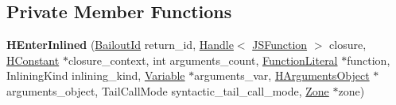 \subsection*{Private Member Functions}
\begin{DoxyCompactItemize}
\item 
{\bfseries H\+Enter\+Inlined} (\hyperlink{classv8_1_1internal_1_1_bailout_id}{Bailout\+Id} return\+\_\+id, \hyperlink{classv8_1_1internal_1_1_handle}{Handle}$<$ \hyperlink{classv8_1_1internal_1_1_j_s_function}{J\+S\+Function} $>$ closure, \hyperlink{classv8_1_1internal_1_1_h_constant}{H\+Constant} $\ast$closure\+\_\+context, int arguments\+\_\+count, \hyperlink{classv8_1_1internal_1_1_function_literal}{Function\+Literal} $\ast$function, Inlining\+Kind inlining\+\_\+kind, \hyperlink{classv8_1_1internal_1_1_variable}{Variable} $\ast$arguments\+\_\+var, \hyperlink{classv8_1_1internal_1_1_h_arguments_object}{H\+Arguments\+Object} $\ast$arguments\+\_\+object, Tail\+Call\+Mode syntactic\+\_\+tail\+\_\+call\+\_\+mode, \hyperlink{classv8_1_1internal_1_1_zone}{Zone} $\ast$zone)\hypertarget{classv8_1_1internal_1_1_h_enter_inlined_a6f3b1480376dc3039d062679ea7350ac}{}\label{classv8_1_1internal_1_1_h_enter_inlined_a6f3b1480376dc3039d062679ea7350ac}

\end{DoxyCompactItemize}
